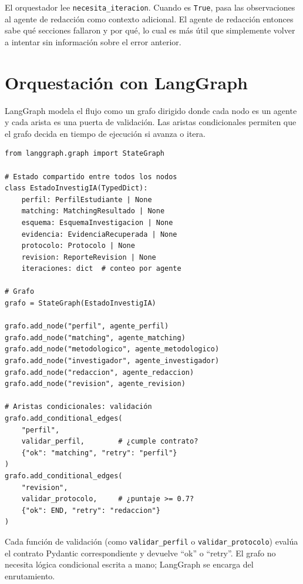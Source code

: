 \documentclass[12pt, a4paper]{article}
\begin{document}
El orquestador lee \texttt{necesita\_iteracion}. Cuando es \texttt{True},
pasa las observaciones al agente de redacción como contexto adicional.
El agente de redacción entonces sabe qué secciones fallaron y por qué,
lo cual es más útil que simplemente volver a intentar sin información
sobre el error anterior.

\section{Orquestación con LangGraph}

LangGraph modela el flujo como un grafo dirigido donde cada nodo es un
agente y cada arista es una puerta de validación. Las aristas condicionales
permiten que el grafo decida en tiempo de ejecución si avanza o itera.

\begin{lstlisting}[style=python]
from langgraph.graph import StateGraph

# Estado compartido entre todos los nodos
class EstadoInvestigIA(TypedDict):
    perfil: PerfilEstudiante | None
    matching: MatchingResultado | None
    esquema: EsquemaInvestigacion | None
    evidencia: EvidenciaRecuperada | None
    protocolo: Protocolo | None
    revision: ReporteRevision | None
    iteraciones: dict  # conteo por agente

# Grafo
grafo = StateGraph(EstadoInvestigIA)

grafo.add_node("perfil", agente_perfil)
grafo.add_node("matching", agente_matching)
grafo.add_node("metodologico", agente_metodologico)
grafo.add_node("investigador", agente_investigador)
grafo.add_node("redaccion", agente_redaccion)
grafo.add_node("revision", agente_revision)

# Aristas condicionales: validación
grafo.add_conditional_edges(
    "perfil",
    validar_perfil,        # ¿cumple contrato?
    {"ok": "matching", "retry": "perfil"}
)
grafo.add_conditional_edges(
    "revision",
    validar_protocolo,     # ¿puntaje >= 0.7?
    {"ok": END, "retry": "redaccion"}
)
\end{lstlisting}

Cada función de validación (como \texttt{validar\_perfil} o
\texttt{validar\_protocolo}) evalúa el contrato Pydantic correspondiente
y devuelve ``ok'' o ``retry''. El grafo no necesita lógica condicional
escrita a mano; LangGraph se encarga del enrutamiento.
\end{document}
